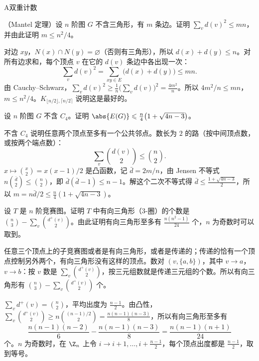 \begin{exercises}{A}{双重计数}
\item\label{ex:double-counting:A1} （Mantel 定理）设 $n$ 阶图 $G$ 不含三角形，有 $m$ 条边。证明 $\sum_vd(v)^2\leqslant mn$，并由此证明 $m\leqslant n^2/4$。
\begin{solution}
对边 $xy$，$N(x)\cap N(y)=\varnothing$（否则有三角形），所以 $d(x)+d(y)\leqslant n$。对所有边求和，每个顶点 $v$ 在它的 $d(v)$ 条边中各出现一次：
\[
\sum_vd(v)^2=\sum_{xy\in E}\bigl(d(x)+d(y)\bigr)\leqslant mn .
\]
由 Cauchy--Schwarz，$\sum_vd(v)^2\geqslant\frac1n\bigl(\sum_vd(v)\bigr)^2=\frac{4m^2}n$。所以 $4m^2/n\leqslant mn$，$m\leqslant n^2/4$。$K_{\lfloor n/2\rfloor,\lceil n/2\rceil}$ 说明这是最好的。
\end{solution}

\item\label{ex:double-counting:A2} 设 $n$ 阶图 $G$ 不含 $C_4$。证明 $\abs{E(G)}\leqslant\frac n4\bigl(1+\sqrt{4n-3}\bigr)$。
\begin{solution}
不含 $C_4$ 说明任意两个顶点至多有一个公共邻点。数长为 $2$ 的路（按中间顶点数，或按两个端点数）：
\[
\sum_v\binom{d(v)}2\leqslant\binom n2 .
\]
$x\mapsto\binom x2=x(x-1)/2$ 是凸函数，记 $\bar d=2m/n$，由 Jensen 不等式 $n\binom{\bar d}2\leqslant\binom n2$，即 $\bar d(\bar d-1)\leqslant n-1$。解这个二次不等式得 $\bar d\leqslant\frac{1+\sqrt{4n-3}}2$，所以 $m=n\bar d/2\leqslant\frac n4(1+\sqrt{4n-3})$。
\end{solution}

\item\label{ex:double-counting:A3} 设 $T$ 是 $n$ 阶竞赛图。证明 $T$ 中有向三角形（$3$-圈）的个数是 $\binom n3-\sum_v\binom{d^+(v)}2$。由此证明有向三角形至多有 $\frac{n(n^2-1)}{24}$ 个，$n$ 为奇数时可以取到。
\begin{solution}
任意三个顶点上的子竞赛图或者是有向三角形，或者是传递的；传递的恰有一个顶点控制另外两个，有向三角形没有这样的顶点。数对 $(v,\{a,b\})$，其中 $v\to a$，$v\to b$：按 $v$ 数是 $\sum_v\binom{d^+(v)}2$，按三元组数就是传递三元组的个数。所以有向三角形有 $\binom n3-\sum_v\binom{d^+(v)}2$ 个。

$\sum_vd^+(v)=\binom n2$，平均出度为 $\frac{n-1}2$。由凸性，$\sum_v\binom{d^+(v)}2\geqslant n\binom{(n-1)/2}2=\frac{n(n-1)(n-3)}8$，所以有向三角形至多有
\[
\frac{n(n-1)(n-2)}6-\frac{n(n-1)(n-3)}8=\frac{n(n-1)(n+1)}{24}
\]
个。$n$ 为奇数时，在 $\Z_n$ 上令 $i\to i+1,\dots,i+\frac{n-1}2$，每个顶点出度都是 $\frac{n-1}2$，取到等号。
\end{solution}


\end{exercises}
